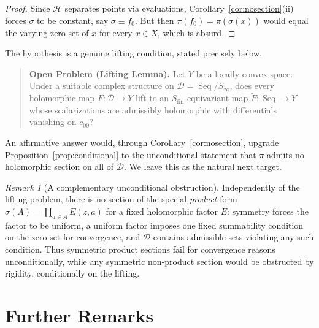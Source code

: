 \documentclass[11pt]{amsart}
\newcommand{\cH}{\mathcal{H}}
\newcommand{\cD}{\mathcal{D}}
\newcommand{\Sfin}{S_{\mathrm{fin}}}
\newcommand{\cc}{c_{00}}
\DeclareMathOperator{\Seq}{Seq}
\theoremstyle{plain}
\theoremstyle{definition}
\theoremstyle{remark}
\newtheorem{remark}[theorem]{Remark}
\begin{document}
\begin{proof}
Since $\cH$ separates points via evaluations,
Corollary~\ref{cor:nosection}(ii) forces $\widetilde\sigma$ to be constant,
say $\widetilde\sigma\equiv f_0$. But then $\pi(f_0)=\pi(\widetilde\sigma
(x))$ would equal the varying zero set of $x$ for every $x\in X$, which is
absurd.
\end{proof}

The hypothesis is a genuine lifting condition, stated precisely below.

\begin{quotation}\noindent
\textbf{Open Problem (Lifting Lemma).}
Let $Y$ be a locally convex space. Under a suitable complex structure on
$\cD=\Seq/S_\infty$, does every holomorphic map $F:\cD\to Y$ lift to an
$\Sfin$-equivariant map $\widetilde F:\Seq\to Y$ whose scalarizations are
admissibly holomorphic with differentials vanishing on $\cc$?
\end{quotation}

\noindent An affirmative answer would, through
Corollary~\ref{cor:nosection}, upgrade
Proposition~\ref{prop:conditional} to the unconditional statement that
$\pi$ admits no holomorphic section on all of $\cD$. We leave this as the
natural next target.

\begin{remark}[A complementary unconditional obstruction]
Independently of the lifting problem, there is no section of the special
\emph{product} form $\sigma(A)=\prod_{a\in A}E(z,a)$ for a fixed
holomorphic factor $E$: symmetry forces the factor to be uniform, a uniform
factor imposes one fixed summability condition on the zero set for
convergence, and $\cD$ contains admissible sets violating any such
condition. Thus symmetric product sections fail for convergence reasons
unconditionally, while any symmetric non-product section would be obstructed
by rigidity, conditionally on the lifting.
\end{remark}

\section{Further Remarks}
\label{sec:variants}
\end{document}

